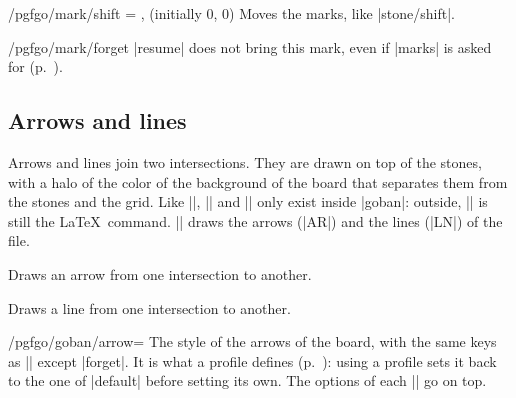 \begin{key}{/pgfgo/mark/shift = ,  (initially 0, 0)}
	Moves the marks, like |stone/shift|.
\end{key}

\begin{key}{/pgfgo/mark/forget}
	|resume| does not bring this mark, even if |marks| is asked for (p.~\pageref{subsec:recordar}).
\end{key}


\subsection{Arrows and lines}
\label{subsec:flechas}

Arrows and lines join two intersections. They are drawn on top of the stones, with a halo of the color of the background of the board that separates them from the stones and the grid. Like |\mark|, |\arrow| and |\line| only exist inside |goban|: outside, |\line| is still the \LaTeX\ command. |\sgf| draws the arrows (|AR|) and the lines (|LN|) of the file.

\begin{command}{\arrow{}}
	Draws an arrow from one intersection to another.

	\begin{codeexample}[]
		\begin{goban}[9]
		\end{goban}
	\end{codeexample}
\end{command}

\begin{command}{\line{}}
	Draws a line from one intersection to another.

	\begin{codeexample}[]
		\begin{goban}[9]
		\end{goban}
	\end{codeexample}
\end{command}

\begin{key}{/pgfgo/goban/arrow=}
	The style of the arrows of the board, with the same keys as |\arrow| except |forget|. It is what a profile defines (p.~\pageref{subsec:perfiles}): using a profile sets it back to the one of |default| before setting its own. The options of each |\arrow| go on top.

	\begin{codeexample}[]
		\begin{goban}[9, arrow = {color = red!80!black, width = 0.6pt}]
		\end{goban}
	\end{codeexample}
\end{key}


